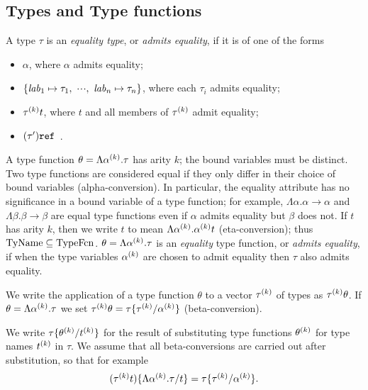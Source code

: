 \subsection{Types and Type functions}
\label{tyfun-sec}
A type $\tau$ is an {\sl equality type}, or {\sl admits equality}, if it is
of one of the forms
\begin{itemize}
\item $\alpha$, where $\alpha$ admits equality;
\item $\{\lab_1\mapsto\tau_1,\ \cdots,\ \lab_n\mapsto\tau_n\}$,
      where each $\tau_i$ admits equality;
\item $\mbox{$\tau^{(k)}$}t$, where $t$ and all members of $\mbox{$\tau^{(k)}$}$ admit equality;
\item $(\tau')\mbox{\tt ref}$\ .
\end{itemize}
\label{tyfcn-lab}
A type function $\theta=\Lambda\mbox{$\alpha^{(k)}$}.\tau$
 has arity $k$;  the bound variables must
be distinct. Two type functions are considered equal
if they only differ in their choice of bound variables (alpha-conversion).
In particular, the equality attribute has no significance in a 
bound variable of a type function; for example, $\Lambda\alpha.\alpha\to
\alpha$ and $\Lambda\beta.\beta\to\beta$ are equal type functions
even if $\alpha$ admits equality but $\beta$ does not.
If $t$ has arity $k$, then we write $t$ to mean $\Lambda\mbox{$\alpha^{(k)}$}.\mbox{$\alpha^{(k)}$}t$
(eta-conversion); thus ${\rm TyName}\subseteq{\rm TypeFcn}$. $\theta=\Lambda\mbox{$\alpha^{(k)}$}.\tau$
is an {\sl equality} type function, or {\sl admits equality}, if when the
type variables $\mbox{$\alpha^{(k)}$}$ are chosen to admit equality then $\tau$ also admits
equality.

We write the application of a type function $\theta$ to a vector
$\mbox{$\tau^{(k)}$}$ of types as $\mbox{$\tau^{(k)}$}\theta$.
If $\theta=\Lambda\mbox{$\alpha^{(k)}$}.\tau$ we set $\mbox{$\tau^{(k)}$}\theta=\tau\{\mbox{$\tau^{(k)}$}/\mbox{$\alpha^{(k)}$}\}$
(beta-conversion). 

We write $\tau\{\mbox{$\theta^{(k)}$}/\mbox{$t^{(k)}$}\}$ for the result of substituting type
functions $\mbox{$\theta^{(k)}$}$ for type names $\mbox{$t^{(k)}$}$ in $\tau$.
We assume that all beta-conversions
are carried out after substitution, so that for example
\[(\mbox{$\tau^{(k)}$}t)\{\Lambda\mbox{$\alpha^{(k)}$}.\tau/t\}=\tau\{\mbox{$\tau^{(k)}$}/\mbox{$\alpha^{(k)}$}\}.\]
\label{imp-ty-lab}
